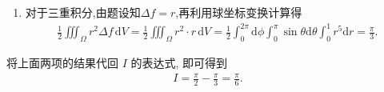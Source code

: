 \documentclass[../../main.tex]{subfiles}%
\begin{document}
\begin{solution}
\begin{enumerate}[(1)]
\item 对于三重积分,由题设知\(\Delta f = r\),再利用球坐标变换计算得
\begin{align*}
\frac{1}{2} \iiint_{\Omega} r^2 \Delta f \, \mathrm{d}V = \frac{1}{2} \iiint_{\Omega} r^2 \cdot r \, \mathrm{d}V = \frac{1}{2} \int_{0}^{2\pi} \mathrm{d}\phi \int_{0}^{\pi} \sin\theta \mathrm{d}\theta \int_{0}^{1} r^5 \mathrm{d}r = \frac{\pi}{3}.
\end{align*}
\end{enumerate}
将上面两项的结果代回 \(I\) 的表达式, 即可得到
\begin{align*}
I = \frac{\pi}{2} - \frac{\pi}{3} = \frac{\pi}{6}.
\end{align*}
\end{solution}
\end{document}
